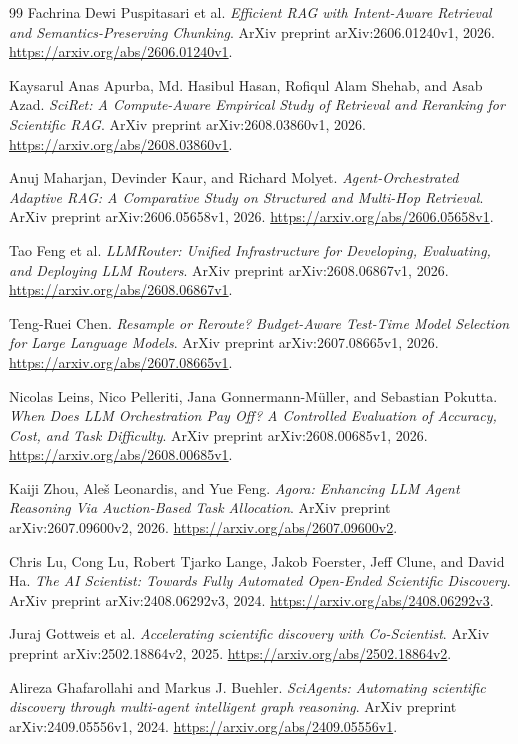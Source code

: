 \documentclass[11pt,a4paper]{article}
\begin{document}
\begin{thebibliography}{99}
Fachrina Dewi Puspitasari et al.
\emph{Efficient RAG with Intent-Aware Retrieval and Semantics-Preserving
Chunking}.
ArXiv preprint arXiv:2606.01240v1, 2026.
\url{https://arxiv.org/abs/2606.01240v1}.

Kaysarul Anas Apurba, Md. Hasibul Hasan, Rofiqul Alam Shehab, and Asab Azad.
\emph{SciRet: A Compute-Aware Empirical Study of Retrieval and Reranking for
Scientific RAG}.
ArXiv preprint arXiv:2608.03860v1, 2026.
\url{https://arxiv.org/abs/2608.03860v1}.

Anuj Maharjan, Devinder Kaur, and Richard Molyet.
\emph{Agent-Orchestrated Adaptive RAG: A Comparative Study on Structured and
Multi-Hop Retrieval}.
ArXiv preprint arXiv:2606.05658v1, 2026.
\url{https://arxiv.org/abs/2606.05658v1}.

Tao Feng et al.
\emph{LLMRouter: Unified Infrastructure for Developing, Evaluating, and
Deploying LLM Routers}.
ArXiv preprint arXiv:2608.06867v1, 2026.
\url{https://arxiv.org/abs/2608.06867v1}.

Teng-Ruei Chen.
\emph{Resample or Reroute? Budget-Aware Test-Time Model Selection for Large
Language Models}.
ArXiv preprint arXiv:2607.08665v1, 2026.
\url{https://arxiv.org/abs/2607.08665v1}.

Nicolas Leins, Nico Pelleriti, Jana Gonnermann-M\"uller, and Sebastian Pokutta.
\emph{When Does LLM Orchestration Pay Off? A Controlled Evaluation of Accuracy,
Cost, and Task Difficulty}.
ArXiv preprint arXiv:2608.00685v1, 2026.
\url{https://arxiv.org/abs/2608.00685v1}.

Kaiji Zhou, Ale\v{s} Leonardis, and Yue Feng.
\emph{Agora: Enhancing LLM Agent Reasoning Via Auction-Based Task Allocation}.
ArXiv preprint arXiv:2607.09600v2, 2026.
\url{https://arxiv.org/abs/2607.09600v2}.

Chris Lu, Cong Lu, Robert Tjarko Lange, Jakob Foerster, Jeff Clune, and David Ha.
\emph{The AI Scientist: Towards Fully Automated Open-Ended Scientific Discovery}.
ArXiv preprint arXiv:2408.06292v3, 2024.
\url{https://arxiv.org/abs/2408.06292v3}.

Juraj Gottweis et al.
\emph{Accelerating scientific discovery with Co-Scientist}.
ArXiv preprint arXiv:2502.18864v2, 2025.
\url{https://arxiv.org/abs/2502.18864v2}.

Alireza Ghafarollahi and Markus J. Buehler.
\emph{SciAgents: Automating scientific discovery through multi-agent intelligent
graph reasoning}.
ArXiv preprint arXiv:2409.05556v1, 2024.
\url{https://arxiv.org/abs/2409.05556v1}.


\end{thebibliography}
\end{document}
